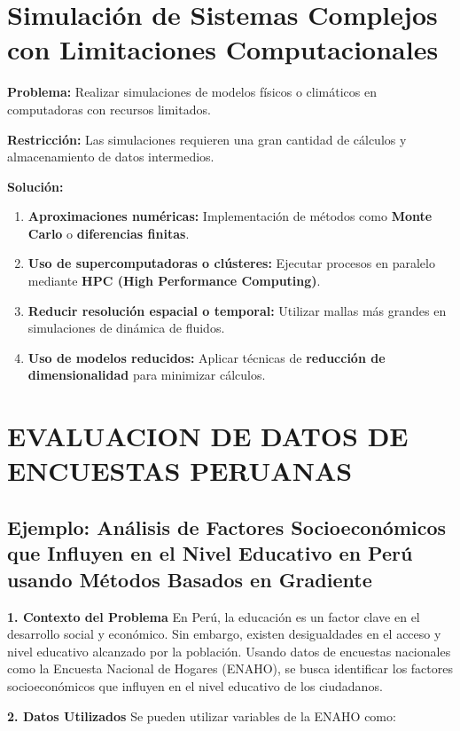 \documentclass{article}
\begin{document}
	\section{Simulación de Sistemas Complejos con Limitaciones Computacionales}
	
	\textbf{Problema:}  
	Realizar simulaciones de modelos físicos o climáticos en computadoras con recursos limitados.
	
	\textbf{Restricción:}  
	Las simulaciones requieren una gran cantidad de cálculos y almacenamiento de datos intermedios.
	
	\textbf{Solución:}
	\begin{enumerate}
	\item \textbf{Aproximaciones numéricas:} Implementación de métodos como \textbf{Monte Carlo} o \textbf{diferencias finitas}.
	\item \textbf{Uso de supercomputadoras o clústeres:} Ejecutar procesos en paralelo mediante \textbf{HPC (High Performance Computing)}.
	\item \textbf{Reducir resolución espacial o temporal:} Utilizar mallas más grandes en simulaciones de dinámica de fluidos.
	\item \textbf{Uso de modelos reducidos:} Aplicar técnicas de \textbf{reducción de dimensionalidad} para minimizar cálculos.
	\end{enumerate}
	
	\section{EVALUACION DE DATOS DE ENCUESTAS PERUANAS}
	
	\subsection{Ejemplo: Análisis de Factores Socioeconómicos que Influyen en el Nivel Educativo en Perú usando Métodos Basados en Gradiente}
	
	\textbf{1. Contexto del Problema}
	En Perú, la educación es un factor clave en el desarrollo social y económico. Sin embargo, existen desigualdades en el acceso y nivel educativo alcanzado por la población. Usando datos de encuestas nacionales como la Encuesta Nacional de Hogares (ENAHO), se busca identificar los factores socioeconómicos que influyen en el nivel educativo de los ciudadanos.
	
	\textbf{2. Datos Utilizados}
	Se pueden utilizar variables de la ENAHO como:
	
\end{document}
